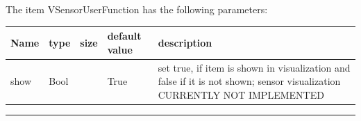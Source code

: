 \noindent The item VSensorUserFunction has the following parameters:
\begin{center}
  \footnotesize
  \begin{longtable}{| p{4.5cm} | p{2.5cm} | p{0.5cm} | p{2.5cm} | p{6cm} |}
    \hline
    \bf Name & \bf type & \bf size & \bf default value & \bf description \\ \hline
    show &     Bool &      &     True &     set true, if item is shown in visualization and false if it is not shown; sensor visualization CURRENTLY NOT IMPLEMENTED\\ \hline
\end{longtable}
\end{center}
\par\noindent\rule{\textwidth}{0.4pt}
\label{description_SensorUserFunction}
